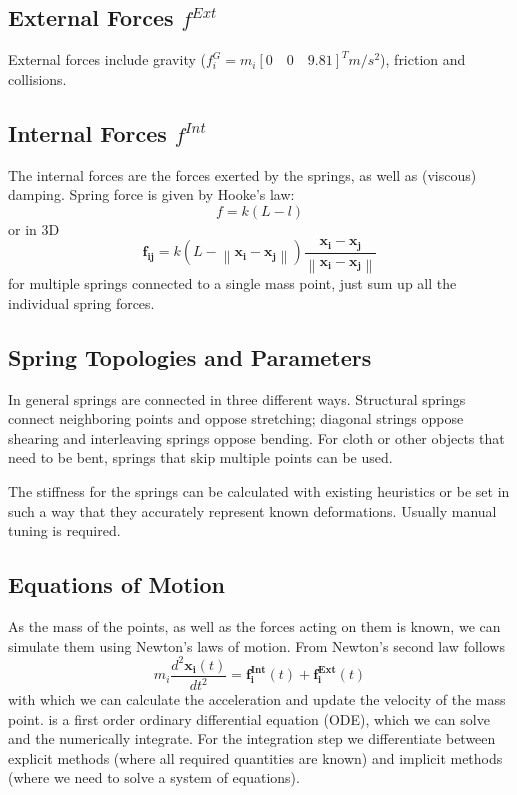 \documentclass{article}
\newcommand{\norm}[1]{\left\lVert#1\right\rVert}
\begin{document}
\subsection{External Forces $f^{Ext}$}
External forces include gravity ($f^G_i = m_i \left[0\quad0\quad9.81\right]^T m/s^2$), friction and collisions.

\subsection{Internal Forces $f^{Int}$}
The internal forces are the forces exerted by the springs, as well as (viscous) damping.
Spring force is given by Hooke's law:
\begin{equation}
    f = k(L-l)
\end{equation}
or in 3D
\begin{equation}
    \bm{f_{ij}} = k(L-\norm{\bm{x_i} - \bm{x_j}})\frac{\bm{x_i}-\bm{x_j}}{\norm{\bm{x_i}-\bm{x_j}}}
\end{equation}
for multiple springs connected to a single mass point, just sum up all the individual spring forces.

\subsection{Spring Topologies and Parameters}
In general springs are connected in three different ways.
Structural springs connect neighboring points and oppose stretching; diagonal strings oppose shearing and interleaving springs oppose bending.
For cloth or other objects that need to be bent, springs that skip multiple points can be used.

The stiffness for the springs can be calculated with existing heuristics or be set in such a way that they accurately represent known deformations.
Usually manual tuning is required.

\subsection{Equations of Motion}
As the mass of the points, as well as the forces acting on them is known, we can simulate them using Newton's laws of motion.
From Newton's second law follows
\begin{equation}
    \label{eq:acceleration}
    m_i\frac{d^2\bm{x_i}(t)}{dt^2} = \bm{f_i^{Int}}(t) + \bm{f_i^{Ext}}(t)
\end{equation}
with which we can calculate the acceleration and update the velocity of the mass point.
 is a first order ordinary differential equation (ODE), which we can solve and the numerically integrate.
For the integration step we differentiate between explicit methods (where all required quantities are known) and implicit methods (where we need to solve a system of equations).
\end{document}
